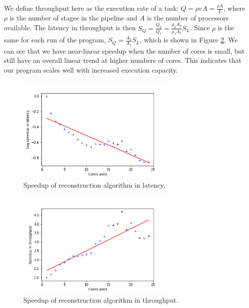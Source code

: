 We define throughput here as the execution rate of a task: $Q = \rho v A = \frac{\rho A}{L}$, where $\rho$ is the number of stages in the pipeline and $A$ is the number of processors available. The latency in throughput is then $S_Q = \frac{Q_2}{Q_1} = \frac{\rho_2 A_2}{\rho_1 A_1} S_L$. Since $\rho$ is the same for each run of the program, $S_Q = \frac{A_2}{A_1} S_L$, which is shown in Figure \ref{fig:through_speedup}. We can see that we have near-linear speedup when the number of cores is small, but still have an overall linear trend at higher numbers of cores. This indicates that our program scales well with increased execution capacity.

\begin{figure}
    \centering
    \includegraphics[width=0.7\textwidth]{graphs/Cassini_latency_speedup.png}
    \caption{Speedup of reconstruction algorithm in latency.}
    \label{fig:latency_speedup}
\end{figure}

\begin{figure}
    \centering
    \includegraphics[width=0.7\textwidth]{graphs/Cassini_throughput_speedup.png}
    \caption{Speedup of reconstruction algorithm in throughput.}
    \label{fig:through_speedup}
\end{figure}



